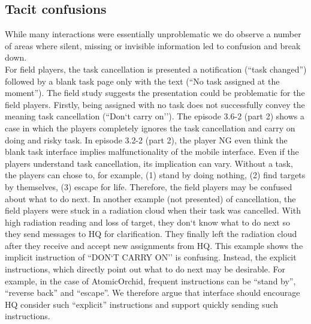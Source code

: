 \subsection{Tacit confusions}
While many interactions were essentially unproblematic we do observe a number of areas where silent, missing or invisible information led to confusion and break down.\\

For field players, the task cancellation is presented a notification (``task changed'') followed by a blank task page only with the text (``No task assigned at the moment''). The field study suggests the presentation could be problematic for the field players. Firstly, being assigned with no task does not successfully convey the meaning task cancellation (``Don`t carry on''). The episode 3.6-2 (part 2) shows a case in which the players completely ignores the task cancellation and carry on doing and risky task. In episode 3.2-2 (part 2), the player NG even think the blank task interface implies malfunctionality of the mobile interface. Even if the players understand task cancellation, its implication can vary. Without a task, the players can chose to, for example, (1) stand by doing nothing, (2) find targets by themselves, (3) escape for life. Therefore, the field players may be confused about what to do next. In another example (not presented) of cancellation, the field players were stuck in a radiation cloud when their task was cancelled. With high radiation reading and loss of target, they don`t know what to do next so they send messages to HQ for clarification. They finally left the radiation cloud after they receive and accept new assignments from HQ. This example shows the implicit instruction of ``DON`T CARRY ON'' is confusing. Instead, the explicit instructions, which directly point out what to do next may be desirable. For example, in the case of AtomicOrchid, frequent instructions can be ``stand by'', ``reverse back'' and ``escape''. We therefore argue that interface should encourage HQ consider such ``explicit'' instructions and support quickly sending such instructions. \\

